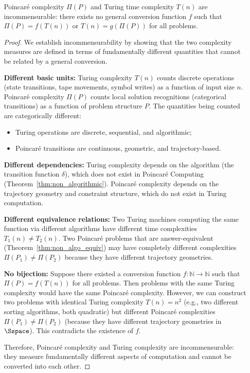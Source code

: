 \begin{theorem}[Incommensurability]
\label{thm:incommensurability}
Poincaré complexity $\Pi(P)$ and Turing time complexity $T(n)$ are incommensurable: there exists no general conversion function $f$ such that $\Pi(P) = f(T(n))$ or $T(n) = g(\Pi(P))$ for all problems.
\end{theorem}

\begin{proof}
We establish incommensurability by showing that the two complexity measures are defined in terms of fundamentally different quantities that cannot be related by a general conversion.

\textbf{Different basic units:} Turing complexity $T(n)$ counts discrete operations (state transitions, tape movements, symbol writes) as a function of input size $n$. Poincaré complexity $\Pi(P)$ counts local solution recognitions (categorical transitions) as a function of problem structure $P$. The quantities being counted are categorically different:
\begin{itemize}
    \item Turing operations are discrete, sequential, and algorithmic;
    \item Poincaré transitions are continuous, geometric, and trajectory-based.
\end{itemize}

\textbf{Different dependencies:} Turing complexity depends on the algorithm (the transition function $\delta$), which does not exist in Poincaré Computing (Theorem~\ref{thm:non_algorithmic}). Poincaré complexity depends on the trajectory geometry and constraint structure, which do not exist in Turing computation.

\textbf{Different equivalence relations:} Two Turing machines computing the same function via different algorithms have different time complexities $T_1(n) \neq T_2(n)$. Two Poincaré problems that are answer-equivalent (Theorem~\ref{thm:non_algo_equiv}) may have completely different complexities $\Pi(P_1) \neq \Pi(P_2)$ because they have different trajectory geometries.

\textbf{No bijection:} Suppose there existed a conversion function $f: \mathbb{N} \to \mathbb{N}$ such that $\Pi(P) = f(T(n))$ for all problems. Then problems with the same Turing complexity would have the same Poincaré complexity. However, we can construct two problems with identical Turing complexity $T(n) = n^2$ (e.g., two different sorting algorithms, both quadratic) but different Poincaré complexities $\Pi(P_1) \neq \Pi(P_2)$ (because they have different trajectory geometries in $\Sspace$). This contradicts the existence of $f$.

Therefore, Poincaré complexity and Turing complexity are incommensurable: they measure fundamentally different aspects of computation and cannot be converted into each other.
\end{proof}

